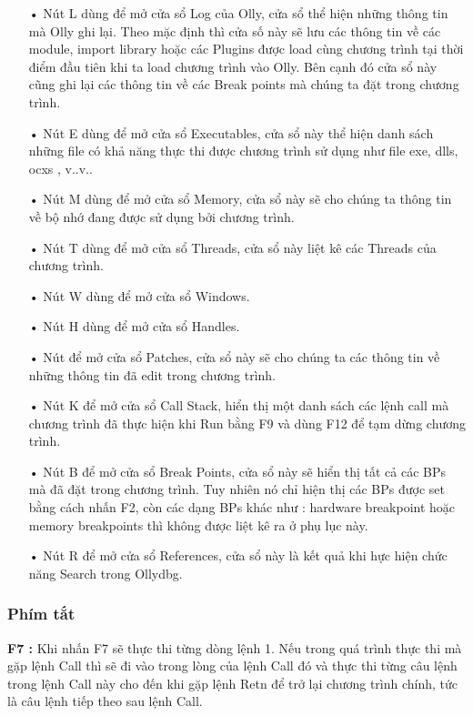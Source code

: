 		\begin{itemize}
			\item[•] 	Nút L dùng để mở cửa sổ Log của Olly, cửa sổ thể hiện những thông tin mà Olly ghi lại. Theo mặc định thì cửa số này sẽ lưu các thông tin về các module, import library hoặc các Plugins được load cùng chương trình tại thời điểm đầu tiên khi ta load chương trình vào Olly. Bên cạnh đó cửa sổ này cũng ghi lại các thông tin về các Break points mà chúng ta đặt trong chương trình.
			\item[• ] Nút E dùng để mở cửa sổ Executables, cửa sổ này thể hiện danh sách những file có khả năng thực thi được chương trình sử dụng như file exe, dlls, ocxs , v..v.. 
			\item[•] Nút M dùng để mở cửa sổ Memory, cửa sổ này sẽ cho chúng ta thông tin về bộ nhớ đang được sử dụng bởi chương trình.
			\item[• ] 	Nút T dùng để mở cửa sổ Threads, cửa sổ này liệt kê các Threads của chương trình.
			\item[•]  	Nút W dùng để mở cửa sổ Windows.
			\item[• ] 	Nút H dùng để mở cửa sổ Handles.
			\item[• ]  Nút \/ để mở cửa sổ Patches, cửa sổ này sẽ cho chúng ta các thông tin về những thông tin đã edit trong chương trình.
			\item[•]  Nút K để mở cửa sổ Call Stack, hiển thị một danh sách các lệnh call mà chương trình  đã thực hiện khi  Run bằng F9 và dùng F12 để tạm dừng chương trình.
			\item[•]  Nút B để mở cửa sổ Break Points, cửa sổ này sẽ hiển thị tất cả các BPs mà đã đặt trong chương trình. Tuy nhiên nó chỉ hiện thị các BPs được set bằng cách nhấn F2, còn các dạng BPs khác như : hardware breakpoint hoặc memory breakpoints thì không được liệt kê ra ở phụ lục này.
			\item[•] Nút R để mở cửa sổ References, cửa sổ này là kết quả khi hực hiện chức năng Search trong Ollydbg.	
		\end{itemize}		
	
	\subsubsection*{Phím tắt}
	\textbf{F7 : } Khi nhấn F7 sẽ thực thi từng dòng lệnh 1. Nếu trong quá trình thực thi mà gặp lệnh Call thì sẽ đi vào trong lòng của lệnh Call đó và thực thi từng câu lệnh trong lệnh Call này cho đến khi gặp lệnh Retn để trở lại chương trình chính, tức là câu lệnh tiếp theo sau lệnh Call.\\
	
